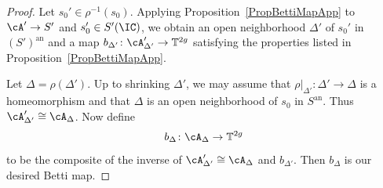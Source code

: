 \begin{proof}
Let $s_0' \in \rho^{-1}(s_0)$. Applying Proposition~\ref{PropBettiMapApp} to $\cA' \rightarrow S'$ and $s_0' \in S'(\IC)$, we obtain an open neighborhood $\Delta'$ of $s_0'$ in $(S')^{\mathrm{an}}$ and a map $b_{\Delta'} \colon \cA'_{\Delta'} \rightarrow \mathbb{T}^{2g}$ satisfying the properties listed in Proposition~\ref{PropBettiMapApp}.

Let $\Delta = \rho(\Delta')$. Up to shrinking $\Delta'$, we may assume that $\rho|_{\Delta'} \colon \Delta' \rightarrow \Delta$ is a homeomorphism and that $\Delta$ is an open neighborhood of $s_0$ in $S^{\mathrm{an}}$. Thus $\cA'_{\Delta'} \cong \cA_{\Delta}$. Now define
\[
b_{\Delta} \colon \cA_{\Delta} \rightarrow \mathbb{T}^{2g}
\]
to be the composite of the inverse of $\cA'_{\Delta'} \cong \cA_{\Delta}$ and $b_{\Delta'}$. Then $b_{\Delta}$ is our desired Betti map.
\end{proof}

